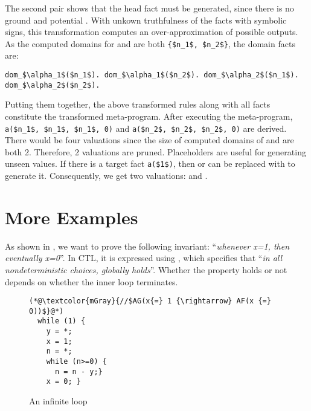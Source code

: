 \documentclass[acmsmall,screen,review,anonymous,nonacm]{acmart}
\begin{document}
The second pair shows that the head fact must be generated, since there is no ground  and potential .
With unkown truthfulness of the facts with symbolic signs, this transformation computes an over-approximation of possible outputs.
As the computed domains for  and  are both \lstinline[mathescape]`{$n_1$, $n_2$}`, the domain facts are:
\begin{lstlisting}[mathescape, xleftmargin=0em, numbers=none, basicstyle=\footnotesize\ttfamily]
dom_$\alpha_1$($n_1$). dom_$\alpha_1$($n_2$). dom_$\alpha_2$($n_1$). dom_$\alpha_2$($n_2$).
\end{lstlisting}
Putting them together, the above transformed rules along with all facts constitute the transformed meta-program.
After executing the meta-program, \lstinline[mathescape]`a($n_1$, $n_1$, $n_1$, 0)` and \lstinline[mathescape]`a($n_2$, $n_2$, $n_2$, 0)` are derived.
There would be four valuations since the size of computed domains of  and  are both 2.
Therefore, 2 valuations are pruned.
Placeholders are useful for generating unseen values.
If there is a target fact \lstinline[mathescape]`a($1$)`, then  or  can be replaced with  to generate it. 
Consequently, we get two valuations: and .


\section{More Examples}




As shown in ,   
we want to prove the following 
invariant: ``\emph{whenever x{=}1, then eventually x{=}0}''.
In CTL, it is expressed using , which specifies that ``\emph{in all nondeterministic choices, \code{\phi} globally holds}''.  
Whether the property holds or not depends on whether the inner loop terminates. 
\begin{wrapfigure}{R}{0.4\columnwidth}
  \begin{lstlisting}[xleftmargin=0.5em,numbersep=5pt,basicstyle=\footnotesize\ttfamily]
  (*@\textcolor{mGray}{//$AG(x{=} 1 {\rightarrow} AF(x {=} 0))$}@*)
  while (1) {
    y = *;
    x = 1;
    n = *; 
    while (n>=0) {
      n = n - y;}
    x = 0; }
  \end{lstlisting} 
  \caption{An infinite loop} 
  \label{fig:example:Infinite_Loops_1}
  \end{wrapfigure}
\end{document}

